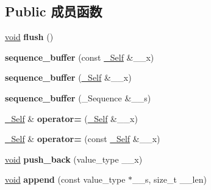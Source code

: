 \subsection*{Public 成员函数}
\begin{DoxyCompactItemize}
\item 
\mbox{\label{classsequence__buffer_a31ce75ec2d22e3d080e2efc02a5710d0}} 
\hyperlink{interfacevoid}{void} {\bfseries flush} ()
\item 
\mbox{\label{classsequence__buffer_a7f06c7b15b951e778bcc7020fd9e35f9}} 
{\bfseries sequence\+\_\+buffer} (const \hyperlink{classsequence__buffer}{\+\_\+\+Self} \&\+\_\+\+\_\+x)
\item 
\mbox{\label{classsequence__buffer_aaf26a120a157bd677990999b703d3967}} 
{\bfseries sequence\+\_\+buffer} (\hyperlink{classsequence__buffer}{\+\_\+\+Self} \&\+\_\+\+\_\+x)
\item 
\mbox{\label{classsequence__buffer_a788907a0637e23f25c7ce0e31432e617}} 
{\bfseries sequence\+\_\+buffer} (\+\_\+\+Sequence \&\+\_\+\+\_\+s)
\item 
\mbox{\label{classsequence__buffer_a0aa4af8456fc39efb4b02268b6e87525}} 
\hyperlink{classsequence__buffer}{\+\_\+\+Self} \& {\bfseries operator=} (\hyperlink{classsequence__buffer}{\+\_\+\+Self} \&\+\_\+\+\_\+x)
\item 
\mbox{\label{classsequence__buffer_afa3c51c336ca36982615b708158b50aa}} 
\hyperlink{classsequence__buffer}{\+\_\+\+Self} \& {\bfseries operator=} (const \hyperlink{classsequence__buffer}{\+\_\+\+Self} \&\+\_\+\+\_\+x)
\item 
\mbox{\label{classsequence__buffer_ac295fa661a752c8b996144fe63b52a93}} 
\hyperlink{interfacevoid}{void} {\bfseries push\+\_\+back} (value\+\_\+type \+\_\+\+\_\+x)
\item 
\mbox{\label{classsequence__buffer_a59b15de23166dfae50557b135c61992d}} 
\hyperlink{interfacevoid}{void} {\bfseries append} (const value\+\_\+type $\ast$\+\_\+\+\_\+s, size\+\_\+t \+\_\+\+\_\+len)
\item 

\end{DoxyCompactItemize}
